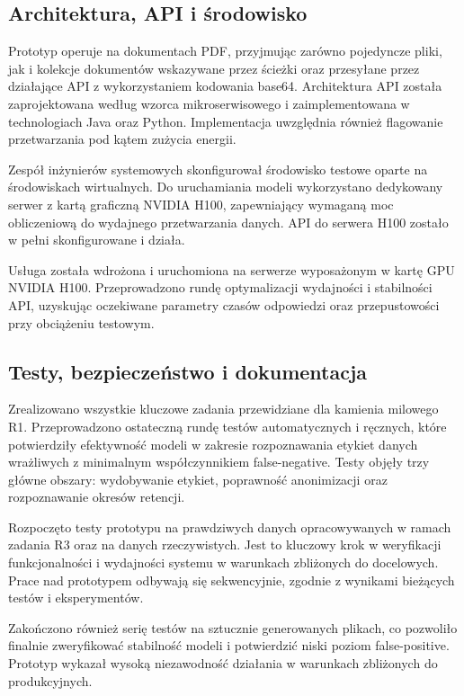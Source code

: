 \documentclass[12pt,a4paper]{report}
\begin{document}
\subsection{Architektura, API i środowisko}
Prototyp operuje na dokumentach PDF, przyjmując zarówno pojedyncze pliki, jak i kolekcje dokumentów wskazywane przez ścieżki oraz przesyłane przez działające API z wykorzystaniem kodowania base64. Architektura API została zaprojektowana według wzorca mikroserwisowego i zaimplementowana w technologiach Java oraz Python. Implementacja uwzględnia również flagowanie przetwarzania pod kątem zużycia energii.

Zespół inżynierów systemowych skonfigurował środowisko testowe oparte na środowiskach wirtualnych. Do uruchamiania modeli wykorzystano dedykowany serwer z kartą graficzną NVIDIA H100, zapewniający wymaganą moc obliczeniową do wydajnego przetwarzania danych. API do serwera H100 zostało w pełni skonfigurowane i działa.

Usługa została wdrożona i uruchomiona na serwerze wyposażonym w kartę GPU NVIDIA H100. Przeprowadzono rundę optymalizacji wydajności i stabilności API, uzyskując oczekiwane parametry czasów odpowiedzi oraz przepustowości przy obciążeniu testowym.

\subsection{Testy, bezpieczeństwo i dokumentacja}
Zrealizowano wszystkie kluczowe zadania przewidziane dla kamienia milowego R1. Przeprowadzono ostateczną rundę testów automatycznych i ręcznych, które potwierdziły efektywność modeli w zakresie rozpoznawania etykiet danych wrażliwych z minimalnym współczynnikiem false-negative. Testy objęły trzy główne obszary: wydobywanie etykiet, poprawność anonimizacji oraz rozpoznawanie okresów retencji.

Rozpoczęto testy prototypu na prawdziwych danych opracowywanych w ramach zadania R3 oraz na danych rzeczywistych. Jest to kluczowy krok w weryfikacji funkcjonalności i wydajności systemu w warunkach zbliżonych do docelowych. Prace nad prototypem odbywają się sekwencyjnie, zgodnie z wynikami bieżących testów i eksperymentów.

Zakończono również serię testów na sztucznie generowanych plikach, co pozwoliło finalnie zweryfikować stabilność modeli i potwierdzić niski poziom false-positive. Prototyp wykazał wysoką niezawodność działania w warunkach zbliżonych do produkcyjnych.
\end{document}
